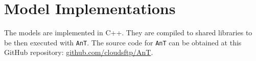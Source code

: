 \section{Model Implementations}
\label{app:impl.models}

The models are implemented in C++.
They are compiled to shared libraries to be then executed with \texttt{AnT}.
The source code for \texttt{AnT} can be obtained at this GitHub repository: \href{https://github.com/cloudsftp/AnT}{github.com/cloudsftp/AnT}.



